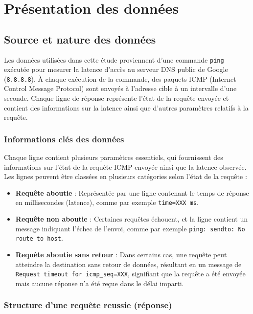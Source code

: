 \section{Présentation des données}

\subsection{Source et nature des données}

Les données utilisées dans cette étude proviennent d'une commande \texttt{ping} exécutée pour mesurer la latence d'accès au serveur DNS public de Google (\texttt{8.8.8.8}). À chaque exécution de la commande, des paquets ICMP (Internet Control Message Protocol) sont envoyés à l'adresse cible à un intervalle d'une seconde. Chaque ligne de réponse représente l'état de la requête envoyée et contient des informations sur la latence ainsi que d'autres paramètres relatifs à la requête.

\subsubsection{Informations clés des données}

Chaque ligne contient plusieurs paramètres essentiels, qui fournissent des informations sur l'état de la requête ICMP envoyée ainsi que la latence observée. Les lignes peuvent être classées en plusieurs catégories selon l'état de la requête :

\begin{itemize}
	\item \textbf{Requête aboutie} : Représentée par une ligne contenant le temps de réponse en millisecondes (latence), comme par exemple \texttt{time=XXX ms}.
	\item \textbf{Requête non aboutie} : Certaines requêtes échouent, et la ligne contient un message indiquant l'échec de l'envoi, comme par exemple \texttt{ping: sendto: No route to host}.
	\item \textbf{Requête aboutie sans retour} : Dans certains cas, une requête peut atteindre la destination sans retour de données, résultant en un message de \texttt{Request timeout for icmp\_seq=XXX}, signifiant que la requête a été envoyée mais aucune réponse n'a été reçue dans le délai imparti.
\end{itemize}

\subsubsection{Structure d'une requête reussie (réponse)}

